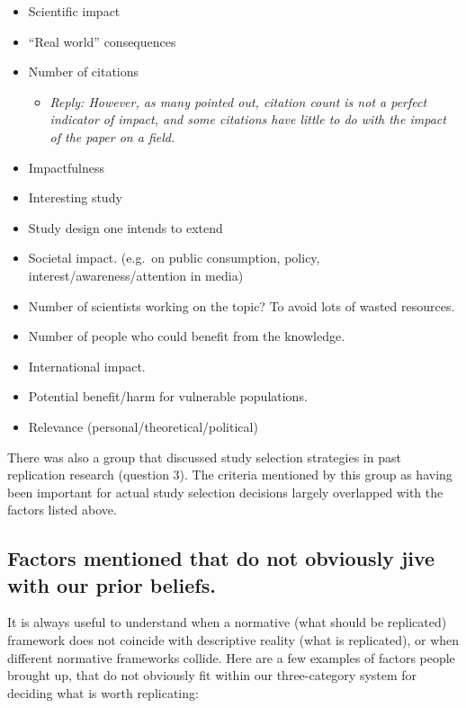 \documentclass[
]{article}
\providecommand{\tightlist}{%
  \setlength{\itemsep}{0pt}\setlength{\parskip}{0pt}}
\begin{document}
\begin{itemize}
\item
  Scientific impact
\item
  ``Real world'' consequences
\item
  Number of citations

  \begin{itemize}
  \tightlist
  \item
    \emph{Reply: However, as many pointed out, citation count is not a
    perfect indicator of impact, and some citations have little to do
    with the impact of the paper on a field. }
  \end{itemize}
\item
  Impactfulness
\item
  Interesting study
\item
  Study design one intends to extend
\item
  Societal impact. (e.g.~on public consumption, policy,
  interest/awareness/attention in media)
\item
  Number of scientists working on the topic? To avoid lots of wasted
  resources.
\item
  Number of people who could benefit from the knowledge.
\item
  International impact.
\item
  Potential benefit/harm for vulnerable populations.
\item
  Relevance (personal/theoretical/political)
\end{itemize}

There was also a group that discussed study selection strategies in past
replication research (question 3). The criteria mentioned by this group
as having been important for actual study selection decisions largely
overlapped with the factors listed above.

\hypertarget{factors-mentioned-that-do-not-obviously-jive-with-our-prior-beliefs.}{%
\subsection{Factors mentioned that do not obviously jive with our prior
beliefs.}\label{factors-mentioned-that-do-not-obviously-jive-with-our-prior-beliefs.}}

It is always useful to understand when a normative (what should be
replicated) framework does not coincide with descriptive reality (what
is replicated), or when different normative frameworks collide. Here are
a few examples of factors people brought up, that do not obviously fit
within our three-category system for deciding what is worth replicating:
\end{document}
